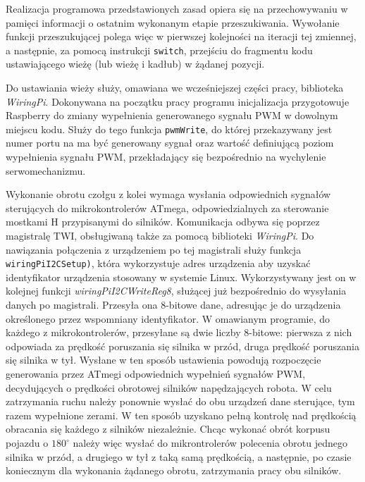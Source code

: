 Realizacja programowa przedstawionych zasad opiera się na przechowywaniu w pamięci informacji o ostatnim wykonanym etapie przeszukiwania. Wywołanie funkcji przeszukującej polega więc w pierwszej kolejności na iteracji tej zmiennej, a następnie, za pomocą instrukcji \texttt{switch}, przejściu do fragmentu kodu ustawiającego wieżę (lub wieżę i kadłub) w żądanej pozycji.

Do ustawiania wieży służy, omawiana we wcześniejszej części pracy, biblioteka \textit{WiringPi}. Dokonywana na początku pracy programu inicjalizacja przygotowuje Raspberry do zmiany wypełnienia generowanego sygnału PWM w dowolnym miejscu kodu.  Służy do tego funkcja \texttt{pwmWrite}, do której przekazywany jest numer portu na ma być generowany sygnał oraz wartość definiującą poziom wypełnienia sygnału PWM, przekładający się bezpośrednio na wychylenie serwomechanizmu.

Wykonanie obrotu czołgu z kolei wymaga wysłania odpowiednich sygnałów sterujących do mikrokontrolerów ATmega, odpowiedzialnych za sterowanie mostkami H przypisanymi do silników. Komunikacja odbywa się poprzez magistralę TWI, obsługiwaną także za pomocą biblioteki \textit{WiringPi}. Do nawiązania połączenia z urządzeniem po tej magistrali służy funkcja \texttt{wiringPiI2CSetup)}, która wykorzystuje adres urządzenia aby uzyskać identyfikator urządzenia stosowany w systemie Linux. Wykorzystywany jest on w kolejnej funkcji \textit{wiringPiI2CWriteReg8}, służącej już bezpośrednio do wysyłania danych po magistrali. Przesyła ona 8-bitowe dane, adresując je do urządzenia określonego przez wspomniany identyfikator. W omawianym programie, do każdego z mikrokontrolerów, przesyłane są dwie liczby 8-bitowe: pierwsza z nich odpowiada za prędkość poruszania się silnika w przód, druga prędkość poruszania się silnika w tył. Wysłane w ten sposób ustawienia powodują rozpoczęcie generowania przez ATmegi odpowiednich wypełnień sygnałów PWM, decydujących o prędkości obrotowej silników napędzających robota. W celu zatrzymania ruchu należy ponownie wysłać do obu urządzeń dane sterujące, tym razem wypełnione zerami. W ten sposób uzyskano pełną kontrolę nad prędkością obracania się każdego z silników niezależnie. Chcąc wykonać obrót korpusu pojazdu o $180^\circ$ należy więc wysłać do mikrontrolerów polecenia obrotu jednego silnika w przód, a drugiego w tył z taką samą prędkością, a następnie, po czasie koniecznym dla wykonania żądanego obrotu, zatrzymania pracy obu silników.

